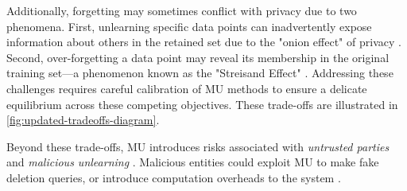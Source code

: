 Additionally, forgetting may sometimes conflict with privacy due to two phenomena. First, unlearning specific data points can inadvertently expose information about others in the retained set due to the "onion effect" of privacy \citep{carlini2022privacyonioneffectmemorization}. Second, over-forgetting \citep{kurmanji2023unboundedmachineunlearning} a data point may reveal its membership in the original training set—a phenomenon known as the "Streisand Effect" \citep{golatkar2020eternal}. Addressing these challenges requires careful calibration of MU methods to ensure a delicate equilibrium across these competing objectives. These trade-offs are illustrated in \autoref{fig:updated-tradeoffs-diagram}.

Beyond these trade-offs, MU introduces risks associated with \textit{untrusted parties} \citep{li2024pseudounlearning} and \textit{malicious unlearning} \citep{qian2023towardsmaliciousunlearning}. Malicious entities could exploit MU to make fake deletion queries, or introduce computation overheads to the system \citep{marchant2022hardtoforget}.




%


